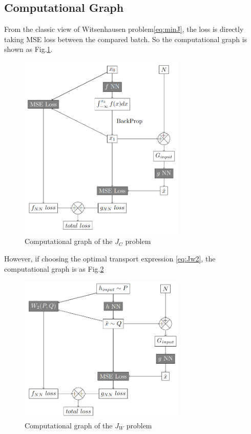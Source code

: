 \documentclass[conference,compsoc]{IEEEtran}
\begin{document}
\subsection{Computational Graph}
From the classic view of Witsenhausen problem\eqref{eq:minJ}, the loss is directly taking MSE loss between the compared batch. So the computational graph is shown as Fig.\ref{fig:classic comp graph}.
\begin{figure}[htp]
  \centering
  \includegraphics[width=8cm]{computational_graph/J_C.png}
  \caption{Computational graph of the $J_C$ problem}
  \label{fig:classic comp graph}
\end{figure}

However, if choosing the optimal transport expression \eqref{eq:Jw2}, the computational graph is as Fig.\ref{fig:Wasserstein comp graph}
\begin{figure}[htp]
  \centering
  \includegraphics[width=8cm]{computational_graph/J_W.png}
  \caption{Computational graph of the $J_W$ problem}
  \label{fig:Wasserstein comp graph}
\end{figure}
\end{document}
